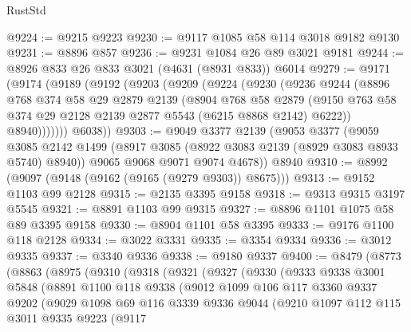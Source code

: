 \begin{lexlean}{RustStd}
\begin{coremodule}
@9224 := @9215 @9223
@9230 := @9117 @1085 @58 @114 @3018 @9182 @9130
@9231 := @8896 @857
@9236 := @9231 @1084 @26 @89 @3021 @9181
@9244 := @8926 @833 @26 @833 @3021 (@4631 (@8931 @833)) @6014
@9279 := @9171
    (@9174
      (@9189
        (@9192
          (@9203
            (@9209
              (@9224
                (@9230
                  (@9236
                    @9244
                    (@8896
                      @768
                      @374
                      @58
                      @29
                      @2879
                      @2139
                      (@8904
                        @768
                        @58
                        @2879
                        (@9150 @763 @58 @374 @29 @2128 @2139 @2877 @5543 (@6215 @8868 @2142) @6222))
                      @8940)))))))
        @6038))
@9303 := @9049
    @3377
    @2139
    (@9053
      @3377
      (@9059
        @3085
        @2142
        @1499
        (@8917 @3085 (@8922 @3083 @2139 (@8929 @3083 @8933 @5740) @8940))
        @9065
        @9068
        @9071
        @9074
        @4678))
    @8940
@9310 := @8992 (@9097 (@9148 (@9162 (@9165 (@9279 @9303)) @8675)))
@9313 := @9152 @1103 @99 @2128
@9315 := @2135 @3395 @9158
@9318 := @9313 @9315 @3197 @5545
@9321 := @8891 @1103 @99 @9315
@9327 := @8896 @1101 @1075 @58 @89 @3395 @9158
@9330 := @8904 @1101 @58 @3395
@9333 := @9176 @1100 @118 @2128
@9334 := @3022 @3331
@9335 := @3354 @9334
@9336 := @3012 @9335
@9337 := @3340 @9336
@9338 := @9180 @9337
@9400 := @8479
    (@8773
      (@8863
        (@8975
          (@9310
            (@9318
              (@9321
                (@9327
                  (@9330
                    (@9333
                      @9338
                      @3001
                      @5848
                      (@8891
                        @1100
                        @118
                        @9338
                        (@9012
                          @1099
                          @106
                          @117
                          @3360
                          @9337
                          @9202
                          (@9029
                            @1098
                            @69
                            @116
                            @3339
                            @9336
                            @9044
                            (@9210
                              @1097
                              @112
                              @115
                              @3011
                              @9335
                              @9223
                              (@9117

\end{coremodule}
\end{lexlean}
